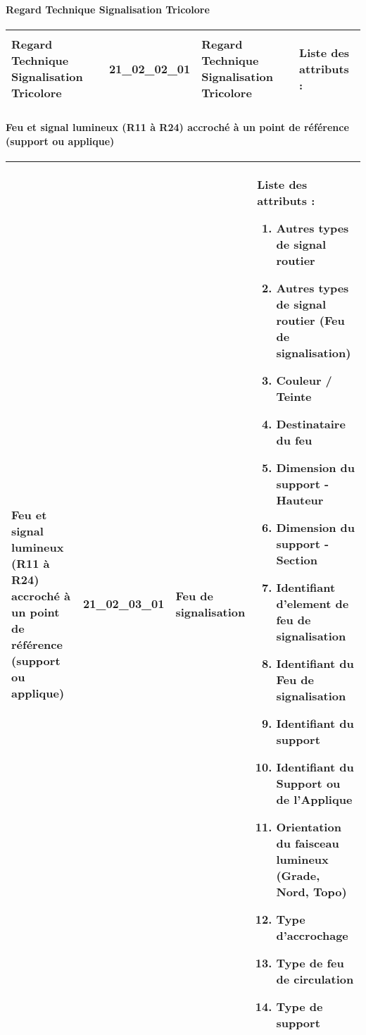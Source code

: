 \documentclass[12pt,titlepage,oneside]{book}
\begin{document}
\paragraph{Regard Technique Signalisation Tricolore}
\noindent
\vspace{\baselineskip}

\renewcommand{\arraystretch}{1.2}
\begin{supertabular}{|p{10cm}|c|p{13cm}|p{12cm}|}
 Regard Technique Signalisation Tricolore & 21\_02\_02\_01 & Regard Technique Signalisation Tricolore & Liste des attributs :
\begin{enumerate}
\end{enumerate}
\\
\hline
\end{supertabular}
\begin{figure}[h!]
  \hfill         %
\end{figure}


\paragraph{Feu et signal lumineux (R11 à R24) accroché à un point de référence (support ou applique)}
\noindent
\vspace{\baselineskip}

\renewcommand{\arraystretch}{1.2}
\begin{supertabular}{|p{10cm}|c|p{13cm}|p{12cm}|}
 Feu et signal lumineux (R11 à R24) accroché à un point de référence (support ou applique) & 21\_02\_03\_01 & Feu de signalisation & Liste des attributs :
\begin{enumerate}
  \item Autres types de signal routier  \item Autres types de signal routier (Feu de signalisation)  \item Couleur / Teinte  \item Destinataire du feu  \item Dimension du support - Hauteur  \item Dimension du support - Section  \item Identifiant d'element de feu de signalisation  \item Identifiant du Feu de signalisation  \item Identifiant du support  \item Identifiant du Support ou de l'Applique  \item Orientation du faisceau lumineux (Grade, Nord, Topo)  \item Type d'accrochage  \item Type de feu de circulation  \item Type de support\end{enumerate}
\\
\hline
\end{supertabular}
\begin{figure}[h!]
  \hfill         %
\end{figure}
\end{document}

